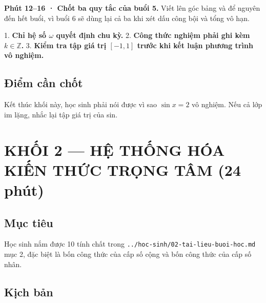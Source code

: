 \documentclass[11pt, a4paper]{article}
\begin{document}

\textbf{Phút 12–16 · Chốt ba quy tắc của buổi 5.} Viết lên góc bảng và để nguyên đến hết buổi, vì buổi 6 sẽ dùng lại cả ba khi xét dấu công bội và tổng vô hạn.

1. \textbf{Chỉ hệ số $\omega$ quyết định chu kỳ.}
2. \textbf{Công thức nghiệm phải ghi kèm $k \in \mathbb{Z}$.}
3. \textbf{Kiểm tra tập giá trị $[-1, 1]$ trước khi kết luận phương trình vô nghiệm.}

\subsection{Điểm cần chốt}

Kết thúc khối này, học sinh phải nói được vì sao $\sin x = 2$ vô nghiệm. Nếu cả lớp im lặng, nhắc lại tập giá trị của sin.

\section{KHỐI 2 — HỆ THỐNG HÓA KIẾN THỨC TRỌNG TÂM (24 phút)}

\subsection{Mục tiêu}

Học sinh nắm được 10 tính chất trong \texttt{../hoc-sinh/02-tai-lieu-buoi-hoc.md} mục 2, đặc biệt là bốn công thức của cấp số cộng và bốn công thức của cấp số nhân.

\subsection{Kịch bản}
\end{document}
